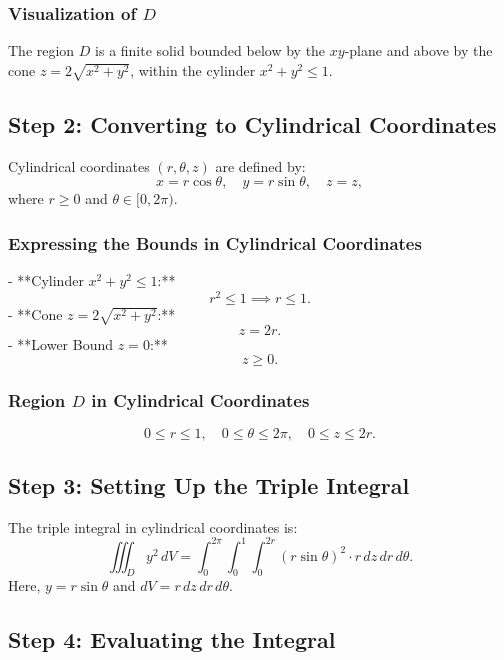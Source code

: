 \documentclass[11pt]{article}
\begin{document}
\subsubsection{Visualization of \( D \)}
The region \( D \) is a finite solid bounded below by the \( xy \)-plane and above by the cone \( z = 2\sqrt{x^2 + y^2} \), within the cylinder \( x^2 + y^2 \leq 1 \).

\newpage

\subsection{Step 2: Converting to Cylindrical Coordinates}

Cylindrical coordinates \((r, \theta, z)\) are defined by:
\[
x = r\cos\theta, \quad y = r\sin\theta, \quad z = z,
\]
where \( r \geq 0 \) and \( \theta \in [0, 2\pi) \).

\newpage

\subsubsection{Expressing the Bounds in Cylindrical Coordinates}
- **Cylinder \( x^2 + y^2 \leq 1 \):**
  \[
  r^2 \leq 1 \implies r \leq 1.
  \]
- **Cone \( z = 2\sqrt{x^2 + y^2} \):**
  \[
  z = 2r.
  \]
- **Lower Bound \( z = 0 \):**
  \[
  z \geq 0.
  \]

\newpage

\subsubsection{Region \( D \) in Cylindrical Coordinates}
\[
0 \leq r \leq 1, \quad 0 \leq \theta \leq 2\pi, \quad 0 \leq z \leq 2r.
\]

\newpage

\subsection{Step 3: Setting Up the Triple Integral}

The triple integral in cylindrical coordinates is:
\[
\iiint_{D} y^2 \, dV = \int_{0}^{2\pi} \int_{0}^{1} \int_{0}^{2r} (r\sin\theta)^2 \cdot r \, dz \, dr \, d\theta.
\]
Here, \( y = r\sin\theta \) and \( dV = r \, dz \, dr \, d\theta \).

\newpage

\subsection{Step 4: Evaluating the Integral}
\end{document}
